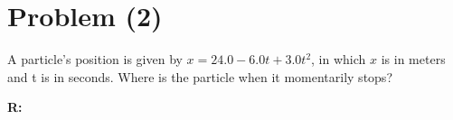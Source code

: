 \section{Problem (2)}
	A particle's position is given by $x = 24.0 - 6.0t + 3.0t^{2}$, in which $x$ is in meters and t is in seconds. Where is the particle when it momentarily stops?

	\textbf{R:} \newline
